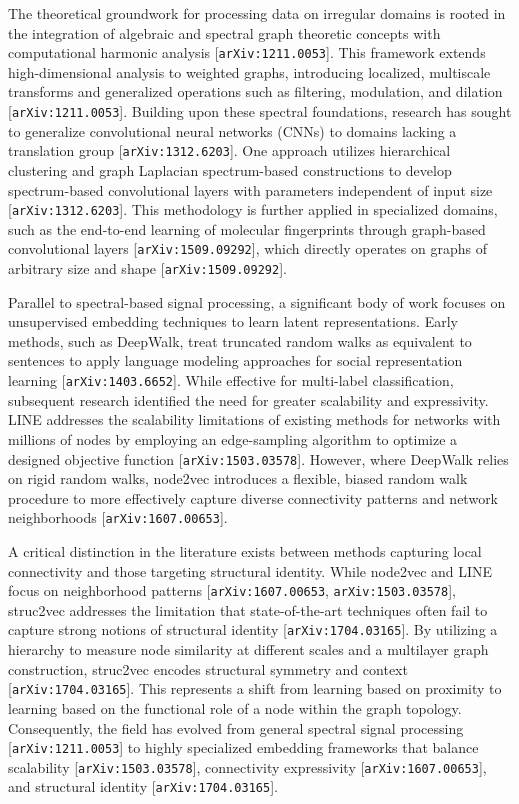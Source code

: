 \documentclass[11pt]{article}
\begin{document}
The theoretical groundwork for processing data on irregular domains is rooted in the integration of algebraic and spectral graph theoretic concepts with computational harmonic analysis [\texttt{arXiv:1211.0053}]. This framework extends high-dimensional analysis to weighted graphs, introducing localized, multiscale transforms and generalized operations such as filtering, modulation, and dilation [\texttt{arXiv:1211.0053}]. Building upon these spectral foundations, research has sought to generalize convolutional neural networks (CNNs) to domains lacking a translation group [\texttt{arXiv:1312.6203}]. One approach utilizes hierarchical clustering and graph Laplacian spectrum-based constructions to develop spectrum-based convolutional layers with parameters independent of input size [\texttt{arXiv:1312.6203}]. This methodology is further applied in specialized domains, such as the end-to-end learning of molecular fingerprints through graph-based convolutional layers [\texttt{arXiv:1509.09292}], which directly operates on graphs of arbitrary size and shape [\texttt{arXiv:1509.09292}].

Parallel to spectral-based signal processing, a significant body of work focuses on unsupervised embedding techniques to learn latent representations. Early methods, such as DeepWalk, treat truncated random walks as equivalent to sentences to apply language modeling approaches for social representation learning [\texttt{arXiv:1403.6652}]. While effective for multi-label classification, subsequent research identified the need for greater scalability and expressivity. LINE addresses the scalability limitations of existing methods for networks with millions of nodes by employing an edge-sampling algorithm to optimize a designed objective function [\texttt{arXiv:1503.03578}]. However, where DeepWalk relies on rigid random walks, node2vec introduces a flexible, biased random walk procedure to more effectively capture diverse connectivity patterns and network neighborhoods [\texttt{arXiv:1607.00653}].

A critical distinction in the literature exists between methods capturing local connectivity and those targeting structural identity. While node2vec and LINE focus on neighborhood patterns [\texttt{arXiv:1607.00653}, \texttt{arXiv:1503.03578}], struc2vec addresses the limitation that state-of-the-art techniques often fail to capture strong notions of structural identity [\texttt{arXiv:1704.03165}]. By utilizing a hierarchy to measure node similarity at different scales and a multilayer graph construction, struc2vec encodes structural symmetry and context [\texttt{arXiv:1704.03165}]. This represents a shift from learning based on proximity to learning based on the functional role of a node within the graph topology. Consequently, the field has evolved from general spectral signal processing [\texttt{arXiv:1211.0053}] to highly specialized embedding frameworks that balance scalability [\texttt{arXiv:1503.03578}], connectivity expressivity [\texttt{arXiv:1607.00653}], and structural identity [\texttt{arXiv:1704.03165}].
\end{document}
